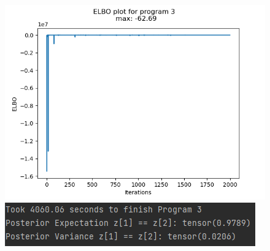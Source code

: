 \documentclass[10pt]{homeworg}
\begin{document}
\begin{figure}[!htbp]
    \centering
    \begin{minipage}{0.45\textwidth}
        \centering
       \includegraphics[scale=0.5]{figures/elbo_program_3.png}
    \end{minipage}\hfill
    \begin{minipage}{0.45\textwidth}
        \centering
        \includegraphics[scale=0.8]{figures/program3_time.png}
    \end{minipage}
\end{figure}



\end{document}

